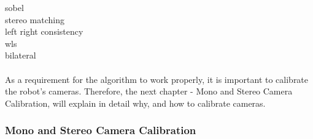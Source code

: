 \cite{sobel2014an}   sobel\\
\cite{hamzah2010sum} stereo matching\\
\cite{egnal2004stereo} left right consistency\\
\cite{min2014fast}   wls\\
\cite{tomasi1998bilateral} bilateral
\\\\
As a requirement for the algorithm to work properly, it is important to calibrate the robot's cameras. Therefore, the next chapter - Mono and Stereo Camera Calibration, will explain in detail why, and how to calibrate cameras.
\subsubsection{Mono and Stereo Camera Calibration}